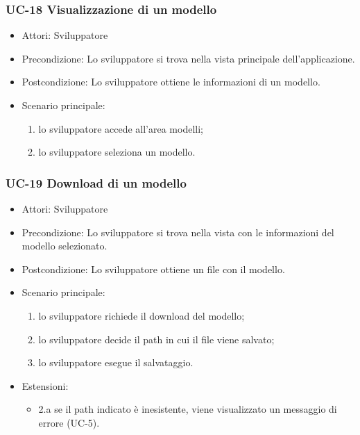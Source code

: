		
	\subsubsection{UC-18 Visualizzazione di un modello}
		\begin{itemize}
			\item Attori: Sviluppatore
			\item Precondizione: Lo sviluppatore si trova nella vista principale dell'applicazione.
			\item Postcondizione: Lo sviluppatore ottiene le informazioni di un modello.
			\item Scenario principale:
			\begin{enumerate}
				\item lo sviluppatore accede all'area modelli;
				\item lo sviluppatore seleziona un modello.
			\end{enumerate}
	\end{itemize}
	
	\subsubsection{UC-19 Download di un modello}
		\begin{itemize}
			\item Attori: Sviluppatore
			\item Precondizione: Lo sviluppatore si trova nella vista con le informazioni del modello selezionato.
			\item Postcondizione: Lo sviluppatore ottiene un file con il modello.
			\item Scenario principale:
			\begin{enumerate}
					\item lo sviluppatore richiede il download del modello;
					\item lo sviluppatore decide il path in cui il file viene salvato;
					\item lo sviluppatore esegue il salvataggio.
				\end{enumerate}
			\item Estensioni:
				\begin{itemize}
					\item 2.a se il path indicato è inesistente, viene visualizzato un messaggio di errore (UC-5).
				\end{itemize}
		\end{itemize}
		
